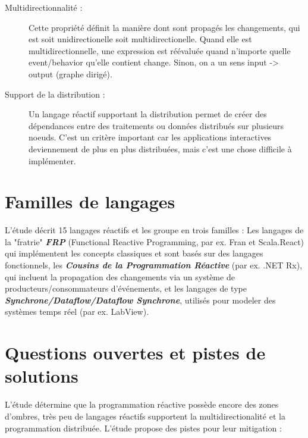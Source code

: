 \documentclass[10pt,final]{IEEEtran}
\begin{document}
\begin{description}
    \item[Multidirectionnalité :]
    Cette propriété définit la manière dont sont propagés les changements, qui est soit unidirectionelle soit multidirectionelle. Quand elle est multidirectionnelle, une expression est réévaluée quand n'importe quelle event/behavior qu'elle contient change. Sinon, on a un sens input -> output (graphe dirigé).
    
    \item[Support de la distribution :]
    Un langage réactif supportant la distribution permet de créer des dépendances entre des traitements ou données distribués sur plusieurs noeuds. C'est un critère important car les applications interactives deviennement de plus en plus distribuées, mais c'est une chose difficile à implémenter.
\end{description}


\section{Familles de langages}

L'étude décrit 15 langages réactifs et les groupe en trois familles : Les langages de la "fratrie" \textit{\textbf{FRP}} (Functional Reactive Programming, par ex. Fran et Scala.React) qui implémentent les concepts classiques et sont basés sur des langages fonctionnels, les \textit{\textbf{Cousins de la Programmation Réactive}} (par ex. .NET Rx), qui incluent la propagation des changements via un système de producteurs/consommateurs d'événements, et les langages de type \textit{\textbf{Synchrone/Dataflow/Dataflow Synchrone}}, utilisés pour modeler des systèmes temps réel (par ex. LabView). 

\section{Questions ouvertes et pistes de solutions}
 
L'étude détermine que la programmation réactive possède encore des zones d'ombres, très peu de langages réactifs
supportent la multidirectionalité et la programmation distribuée. L'étude propose des pistes pour leur mitigation :
\end{document}
